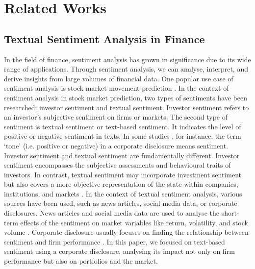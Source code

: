 \documentclass[logo,bsc,singlespacing,parskip]{infthesis}
\begin{document}


\chapter{Related Works}

\section{Textual Sentiment Analysis in Finance}
In the field of finance, sentiment analysis has grown in significance due to its wide range of applications. Through sentiment analysis, we can analyse, interpret, and derive insights from large volumes of financial data. One popular use case of sentiment analysis is stock market movement prediction \cite{Schumaker2009, Shah2018, Maqbool2023, GloddHristova2023, Wang2023, Smailovic2013, Ren2019}. In the context of sentiment analysis in stock market prediction, two types of sentiments have been researched: investor sentiment and textual sentiment. Investor sentiment refers to an investor’s subjective sentiment on firms or markets. The second type of sentiment is textual sentiment or text-based sentiment. It indicates the level of positive or negative sentiment in texts. In some studies \cite{ke2020predicting, Jegadeesh2013}, for instance, the term ‘tone’ (i.e. positive or negative) in a corporate disclosure means sentiment. Investor sentiment and textual sentiment are fundamentally different. Investor sentiment encompasses the subjective assessments and behavioural traits of investors. In contrast, textual sentiment may incorporate investment sentiment but also covers a more objective representation of the state within companies, institutions, and markets \cite{Kearney2014}. In the context of textual sentiment analysis, various sources have been used, such as news articles, social media data, or corporate disclosures. News articles and social media data are used to analyse the short-term effects of the sentiment on market variables like return, volatility, and stock volume \cite{Shah2018, Wang2023}. Corporate disclosure usually focuses on finding the relationship between sentiment and firm performance \cite{Zhou2020, Che2020}. In this paper, we focused on text-based sentiment using a corporate disclosure, analysing its impact not only on firm performance but also on portfolios and the market. 
\end{document}

